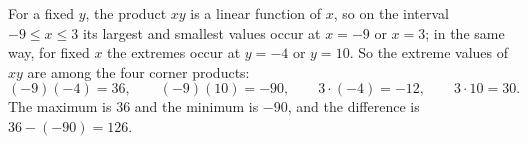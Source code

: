For a fixed $y$, the product $xy$ is a linear function of $x$, so on the interval $-9\le x\le3$ its largest and smallest values occur at $x=-9$ or $x=3$; in the same way, for fixed $x$ the extremes occur at $y=-4$ or $y=10$. So the extreme values of $xy$ are among the four corner products:
\[(-9)(-4)=36,\qquad(-9)(10)=-90,\qquad3\cdot(-4)=-12,\qquad3\cdot10=30.\]
The maximum is $36$ and the minimum is $-90$, and the difference is $36-(-90)=\boxed{126}$.
